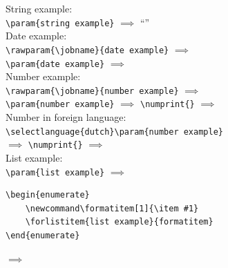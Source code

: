 \documentclass{article}
\begin{document}
    String example:\\

    \lstinline[style=TeX,morekeywords={param}]|\param{string example}|
    $\implies$
    ``''\\

    Date example:\\

    \lstinline[style=TeX,morekeywords={rawparam}]|\rawparam{\jobname}{date example}|
    $\implies$
    \\

    \lstinline[style=TeX,morekeywords={param}]|\param{date example}|
    $\implies$
    \\

    Number example:\\

    \lstinline[style=TeX,morekeywords={rawparam}]|\rawparam{\jobname}{number example}|
    $\implies$
    \\

    \lstinline[style=TeX,morekeywords={param}]|\param{number example}|
    $\implies$
    \lstinline[style=TeX,morekeywords={numprint}]|\numprint{|\verb|}|
    $\implies$
    \\

    Number in foreign language:\\

    \lstinline[style=TeX,morekeywords={param,selectlanguage}]|\selectlanguage{dutch}\param{number example}|\\
    $\implies$
    \lstinline[style=TeX,morekeywords={numprint}]|\numprint{|\lstinline|}|
    $\implies$
    \begingroup{}\endgroup\\

    List example:\\

    \lstinline[style=TeX,morekeywords={param}]|\param{list example}|
    $\implies$
    \\

    \begin{lstlisting}[language={[LaTeX]TeX},morekeywords={formatitem,forlistitem}]
\begin{enumerate}
    \newcommand\formatitem[1]{\item #1}
    \forlistitem{list example}{formatitem}
\end{enumerate}
    \end{lstlisting}
    $\implies$
    \begin{enumerate}
        \newcommand\formatitem[1]{\item #1}
    \end{enumerate}
\end{document}
